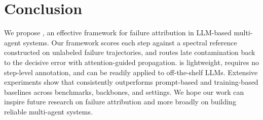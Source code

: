 \section{Conclusion}
\label{sec:conclusion}

We propose \soap, an effective framework for failure attribution in LLM-based multi-agent systems. Our framework scores each step against a spectral reference constructed on unlabeled failure trajectories, and routes late contamination  back to the decisive error with attention-guided propagation. \soap is lightweight, requires no step-level annotation, and can be readily applied to off-the-shelf LLMs. Extensive experiments show that \soap consistently outperforms prompt-based and training-based baselines across benchmarks, backbones, and settings. We hope our work can inspire future research on failure attribution and more broadly on building reliable multi-agent systems.


